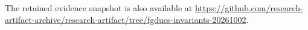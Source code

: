 \documentclass[acmsmall,screen,review,anonymous]{acmart}
\begin{document}
The retained evidence snapshot is also available at \url{https://github.com/research-artifact-archive/research-artifact/tree/fgducs-invariants-20261002}.

\nocite{BoyerGruberPous2013,JiaoGanXiao2013Reconfiguration,Zhang2005SafeAdaptation,ReveliotisFei2017SwitchedDES}


\end{document}
